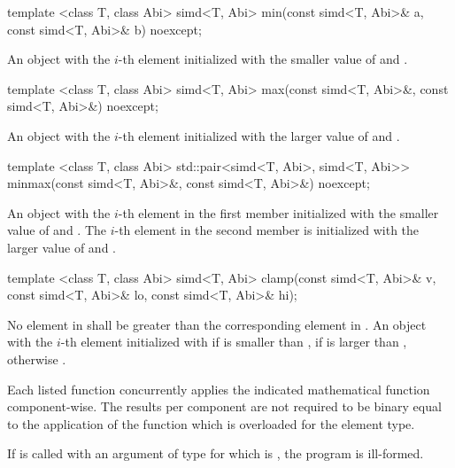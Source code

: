 \begin{itemdecl}
template <class T, class Abi> simd<T, Abi> min(const simd<T, Abi>& a, const simd<T, Abi>& b) noexcept;
\end{itemdecl}
\begin{itemdescr}
  \pnum\returns An object with the $i$-th element initialized with the smaller value of  and  \foralli.
\end{itemdescr}

\begin{itemdecl}
template <class T, class Abi> simd<T, Abi> max(const simd<T, Abi>&, const simd<T, Abi>&) noexcept;
\end{itemdecl}
\begin{itemdescr}
  \pnum\returns An object with the $i$-th element initialized with the larger value of  and  \foralli.
\end{itemdescr}

\begin{itemdecl}
template <class T, class Abi>
std::pair<simd<T, Abi>, simd<T, Abi>> minmax(const simd<T, Abi>&, const simd<T, Abi>&) noexcept;
\end{itemdecl}
\begin{itemdescr}
  \pnum\returns An object with the $i$-th element in the first  member initialized with the smaller value of  and  \foralli.
  The $i$-th element in the second  member is initialized with the larger value of  and  \foralli.
\end{itemdescr}

\begin{itemdecl}
template <class T, class Abi>
simd<T, Abi> clamp(const simd<T, Abi>& v, const simd<T, Abi>& lo, const simd<T, Abi>& hi);
\end{itemdecl}
\begin{itemdescr}
  \pnum\requires No element in  shall be greater than the corresponding element in .
  \pnum\returns An object with the $i$-th element initialized with  if  is smaller than ,  if  is larger than , otherwise  \foralli.
\end{itemdescr}



\pnum Each listed function concurrently applies the indicated mathematical function component-wise.
The results per component are not required to be binary equal to the application of the function which is overloaded for the element type.

\pnum If  is called with an argument of type \simd[<X, Abi>] for which  is \true, the program is ill-formed.

